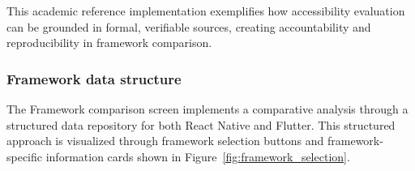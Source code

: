 \FloatBarrier

This academic reference implementation exemplifies how accessibility evaluation can be grounded in formal, verifiable sources, creating accountability and reproducibility in framework comparison.

\subsubsection{Framework data structure}

The Framework comparison screen implements a comparative analysis through a structured data repository for both React Native and Flutter. This structured approach is visualized through framework selection buttons and framework-specific information cards shown in Figure~\ref{fig:framework_selection}.

